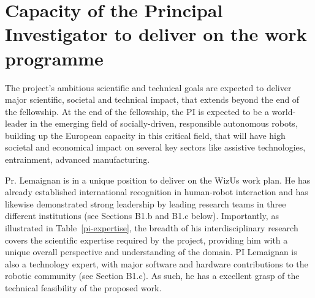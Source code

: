 \documentclass[11pt,a4paper]{report}
\newcommand{\project}{WizUs\xspace}
\begin{document}
\section{Capacity of the Principal Investigator to deliver on the work programme}

The project's ambitious scientific and technical goals are expected to deliver
major scientific, societal and technical impact, that extends beyond the end of
the fellowship. At the end of the fellowship, the PI is expected to be a
world-leader in the emerging field of socially-driven, responsible autonomous
robots, building up the European capacity in this critical
field, that will have high societal and economical impact on several key sectors
like assistive technologies, entrainment, advanced manufacturing.

Pr. Lemaignan is in a unique position to deliver on the \project work plan. He
has already established international recognition in human-robot interaction and
has likewise demonstrated strong leadership by leading research teams in three
different institutions (see Sections B1.b and B1.c below). Importantly, as
illustrated in Table~\ref{pi-expertise}, the breadth of
his interdisciplinary research covers the scientific expertise required by the
project, providing him with a unique overall perspective and understanding of
the domain. PI Lemaignan is also a technology expert, with major software and
hardware contributions to the robotic community (see Section B1.c). As such, he
has a excellent grasp of the technical feasibility of the proposed work.
\end{document}
